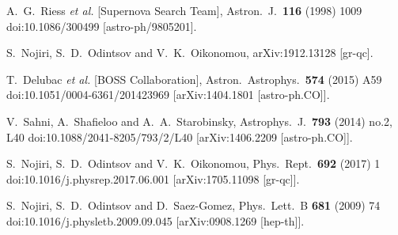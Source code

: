 \documentclass[aps,prd,twocolumn,groupedaddress,showpacs,nofootinbib,amssymb]{revtex4-2}
\begin{document}
\begin{thebibliography}{99}



  A.~G.~Riess {\it et al.} [Supernova Search Team],
  Astron.\ J.\  {\bf 116} (1998) 1009
  doi:10.1086/300499
  [astro-ph/9805201].




  S.~Nojiri, S.~D.~Odintsov and V.~K.~Oikonomou,
  arXiv:1912.13128 [gr-qc].



  T.~Delubac {\it et al.} [BOSS Collaboration],
  Astron.\ Astrophys.\  {\bf 574} (2015) A59
  doi:10.1051/0004-6361/201423969
  [arXiv:1404.1801 [astro-ph.CO]].


  V.~Sahni, A.~Shafieloo and A.~A.~Starobinsky,
  Astrophys.\ J.\  {\bf 793} (2014) no.2,  L40
  doi:10.1088/2041-8205/793/2/L40
  [arXiv:1406.2209 [astro-ph.CO]].



S.~Nojiri, S.~D.~Odintsov and V.~K.~Oikonomou,
Phys.\ Rept.\  {\bf 692} (2017) 1
doi:10.1016/j.physrep.2017.06.001 [arXiv:1705.11098 [gr-qc]].

S.~Nojiri, S.~D.~Odintsov and D.~Saez-Gomez,
Phys.\ Lett.\ B {\bf 681} (2009) 74
doi:10.1016/j.physletb.2009.09.045 [arXiv:0908.1269 [hep-th]].


\end{thebibliography}
\end{document}
